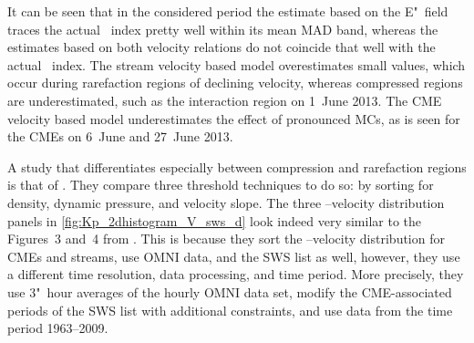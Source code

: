 It can be seen that in the considered period the \Kp{} estimate based on the E"~field traces the actual \Kp~index pretty well within its mean MAD band, whereas the \Kp{} estimates based on both velocity relations do not coincide that well with the actual \Kp~index. The stream velocity based model overestimates small \Kp{} values, which occur during rarefaction regions of declining velocity, whereas compressed regions are underestimated, such as the interaction region on 1~June 2013. The CME velocity based model underestimates the effect of pronounced MCs, as is seen for the CMEs on 6~June and 27~June 2013.

A study that differentiates especially between compression and rarefaction regions is that of \citet{Elliott2013}. They compare three threshold techniques to do so: by sorting for density, dynamic pressure, and velocity slope. The three \Kp--velocity distribution panels in \autoref{fig:Kp_2dhistogram_V_sws_d} look indeed very similar to the Figures~3 and~4 from \citet{Elliott2013}. This is because they sort the \Kp{}--velocity distribution for CMEs and streams, use OMNI data, and the SWS list as well, however, they use a different time resolution, data processing, and time period. More precisely, they use 3"~hour averages of the hourly OMNI data set, modify the CME-associated periods of the SWS list with additional constraints, and use data from the time period 1963--2009.

